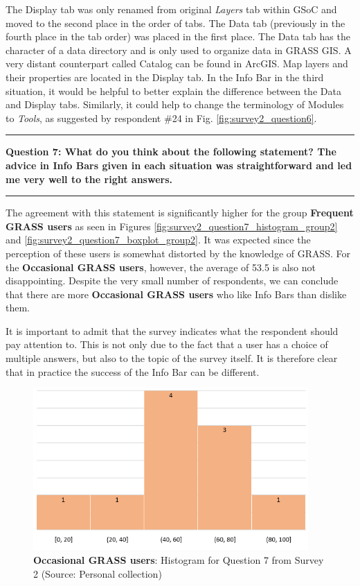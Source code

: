 \documentclass[a4paper,10pt,twoside]{article}
\begin{document}
\newpage
\noindent The Display tab was only renamed from original \textit{Layers} tab within GSoC and moved to the second place in the order of tabs. The Data tab (previously in the fourth place in the tab order) was placed in the first place. The Data tab has the character of a data directory and is only used to organize data in GRASS GIS. A very distant counterpart called Catalog can be found in ArcGIS. Map layers and their properties are located in the Display tab. In the Info Bar in the third situation, it would be helpful to better explain the difference between the Data and Display tabs. Similarly, it could help to change the terminology of Modules to \textit{Tools}, as suggested by respondent \#24 in Fig. \ref{fig:survey2_question6}.

\par\noindent\rule{\textwidth}{0.4pt}
\noindent \textbf{Question 7: What do you think about the following statement? The advice in Info Bars given in each situation was straightforward and led me very well to the right answers.}
\par\noindent\rule{\textwidth}{0.4pt}

\noindent The agreement with this statement is significantly higher for the group \textbf{Frequent GRASS users} as seen in Figures \ref{fig:survey2_question7_histogram_group2} and \ref{fig:survey2_question7_boxplot_group2}. It was expected since the perception of these users is somewhat distorted by the knowledge of GRASS. For the \textbf{Occasional GRASS users}, however, the average of 53.5 is also not disappointing. Despite the very small number of respondents, we can conclude that there are more \textbf{Occasional GRASS users} who like Info Bars than dislike them. 

It is important to admit that the survey indicates what the respondent should pay attention to. This is not only due to the fact that a user has a choice of multiple answers, but also to the topic of the survey itself. It is therefore clear that in practice the success of the Info Bar can be different.

\vspace{0.3cm}
\begin{figure}[hbt!] 
\begin{center}
\includegraphics[width=10.5cm]{../surveys/analyzed_data/survey2_question7_histogram_group1.png} 
\caption[\textbf{Occasional GRASS users}: Histogram for Question 7 from Survey 2]{\textbf{Occasional GRASS users}: Histogram for Question 7 from Survey 2 (Source: Personal collection)}
\label{fig:survey2_question7_histogram_group1}
\end{center}
\end{figure}
\end{document}
